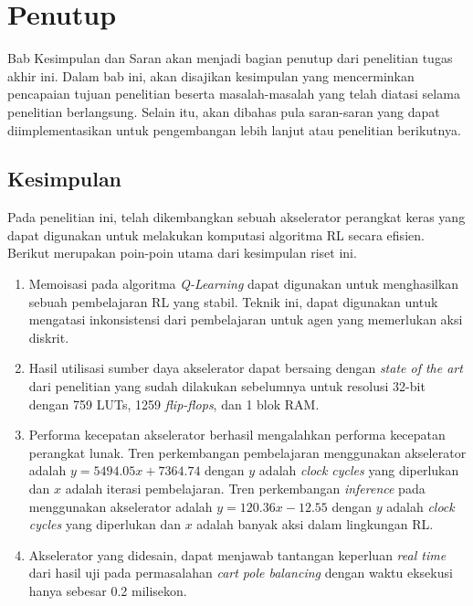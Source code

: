 \chapter{Penutup}

Bab Kesimpulan dan Saran akan menjadi bagian penutup dari penelitian tugas akhir ini. Dalam bab ini, akan disajikan kesimpulan yang mencerminkan pencapaian tujuan penelitian beserta masalah-masalah yang telah diatasi selama penelitian berlangsung. Selain itu, akan dibahas pula saran-saran yang dapat diimplementasikan untuk pengembangan lebih lanjut atau penelitian berikutnya.

\section{Kesimpulan}

Pada penelitian ini, telah dikembangkan sebuah akselerator perangkat keras yang dapat digunakan untuk melakukan komputasi algoritma \ac{RL} secara efisien. Berikut merupakan poin-poin utama dari kesimpulan riset ini.

\begin{enumerate}
	\item Memoisasi pada algoritma \textit{Q-Learning} dapat digunakan untuk menghasilkan sebuah pembelajaran \ac{RL} yang stabil. Teknik ini, dapat digunakan untuk mengatasi inkonsistensi dari pembelajaran untuk agen yang memerlukan aksi diskrit.
	\item Hasil utilisasi sumber daya akselerator dapat bersaing dengan \textit{state of the art} dari penelitian yang sudah dilakukan sebelumnya untuk resolusi 32-bit dengan 759 \ac{LUTs}, 1259 \textit{flip-flops}, dan 1 blok \ac{RAM}.
	\item Performa kecepatan akselerator berhasil mengalahkan performa kecepatan perangkat lunak. Tren perkembangan pembelajaran menggunakan akselerator adalah $y = 5494.05x + 7364.74$ dengan $y$ adalah \textit{clock cycles} yang diperlukan dan $x$ adalah iterasi pembelajaran. Tren perkembangan \textit{inference} pada menggunakan akselerator adalah $y = 120.36x - 12.55$ dengan $y$ adalah \textit{clock cycles} yang diperlukan dan $x$ adalah banyak aksi dalam lingkungan \ac{RL}.
	\item Akselerator yang didesain, dapat menjawab tantangan keperluan \textit{real time} dari hasil uji pada permasalahan \textit{cart pole balancing} dengan waktu eksekusi hanya sebesar 0.2 milisekon.
\end{enumerate}

